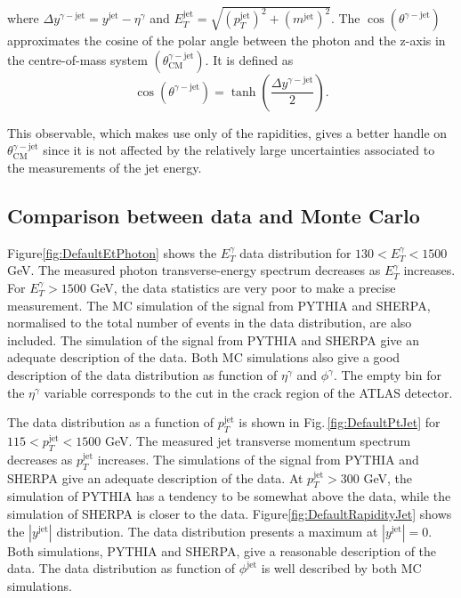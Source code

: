 \documentclass[12pt, twoside]{article}
\numberwithin{equation}{section}
\numberwithin{figure}{section}
\begin{document}
where $\Delta y^{\gamma-\text{jet}} = y^{\text{jet}} - \eta^{\gamma}$ and $E^{\text{jet}}_{T} = \sqrt{\left( p^{\text{jet}}_{T} \right)^{2} + \left( m^{\text{jet}} \right)^{2}}$. The $\cos \left( \theta^{\gamma-\text{jet}} \right)$ approximates the cosine of the polar angle between the photon and the z-axis in the centre-of-mass system $\left( \theta^{\gamma-\text{jet}}_{\text{CM}} \right)$. It is defined as
\begin{equation}    \label{eq:CosThetaPhotonJetDefinition}
    \cos \left( \theta^{\gamma-\text{jet}} \right) = \tanh \left( \frac{\Delta y^{\gamma-\text{jet}}}{2} \right) .
\end{equation}

This observable, which makes use only of the rapidities, gives a better handle on $\theta^{\gamma-\text{jet}}_{\text{CM}}$ since it is not affected by the relatively large uncertainties associated to the measurements of the jet energy.

\subsection{Comparison between data and Monte Carlo}
\label{subsec:ComparisonBetweenDataAndMonteCarlo}

Figure\;\ref{fig:DefaultEtPhoton} shows the $E^{\gamma}_{T}$ data distribution for $130 < E^{\gamma}_{T} < 1500$ GeV. The measured photon transverse-energy spectrum decreases as $E^{\gamma}_{T}$ increases. For $E^{\gamma}_{T} > 1500$ GeV, the data statistics are very poor to make a precise measurement. The MC simulation of the signal from PYTHIA and SHERPA, normalised to the total number of events in the data distribution, are also included. The simulation of the signal from PYTHIA and SHERPA give an adequate description of the data. Both MC simulations also give a good description of the data distribution as function of $\eta^{\gamma}$ and $\phi^{\gamma}$. The empty bin for the $\eta^{\gamma}$ variable corresponds to the cut in the crack region of the ATLAS detector.

The data distribution as a function of $p^{\text{jet}}_{T}$ is shown in Fig.\,\ref{fig:DefaultPtJet} for $115 < p^{\text{jet}}_{T} < 1500$ GeV. The measured jet transverse momentum spectrum decreases as $p^{\text{jet}}_{T}$ increases. The simulations of the signal from PYTHIA and SHERPA give an adequate description of the data. At $p^{\text{jet}}_{T} > 300$ GeV, the simulation of PYTHIA has a tendency to be somewhat above the data, while the simulation of SHERPA is closer to the data. Figure\;\ref{fig:DefaultRapidityJet} shows the $\left| y^{\text{jet}} \right|$ distribution. The data distribution presents a maximum at $\left| y^{\text{jet}} \right| = 0$. Both simulations, PYTHIA and SHERPA, give a reasonable description of the data. The data distribution as function of $\phi^{\text{jet}}$ is well described by both MC simulations.
\end{document}
